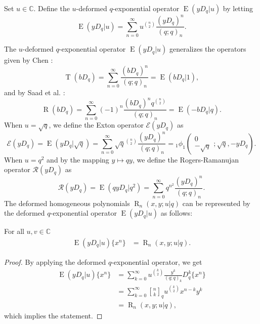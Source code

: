 \documentclass{cimart}
\newcommand{\C}{\mathbb{C}}
\newcommand{\qbinom}{\genfrac{[}{]}{0pt}{}}
\DeclareMathOperator{\opE}{E}
\DeclareMathOperator{\opR}{R}
\DeclareMathOperator{\opT}{T}
\begin{document}
\begin{definition}\label{def_translation}
Set $u\in\C$. Define the $u$-deformed $q$-exponential operator $\opE(yD_{q}|u)$ by letting 
\begin{equation}
    \opE(yD_{q}|u)=\sum_{n=0}^{\infty}u^{\binom{n}{2}}\frac{(yD_{q})^{n}}{(q;q)_{n}}. 
\end{equation}
\end{definition}
The $u$-deformed $q$-exponential operator $\opE(yD_{q}|u)$ generalizes the operators given by Chen \cite{chen2}:
\begin{equation}
    \opT(bD_{q})=\sum_{n=0}^{\infty}\frac{(bD_{q})^n}{(q;q)_{n}}=\opE(bD_{q}|1),
\end{equation}
and by Saad et al. \cite{saad2}:
\begin{equation}
    \opR(bD_{q})=\sum_{n=0}^{\infty}(-1)^{n}\frac{(bD_{q})^nq^{\binom{n}{2}}}{(q;q)_{n}}=\opE(-bD_{q}|q).
\end{equation}
When $u=\sqrt{q}$, we define the Exton operator $\mathcal{E}(yD_{q})$ as
\begin{equation}
    \mathcal{E}(yD_{q})=\opE(yD_{q}|\sqrt{q})=\sum_{n=0}^{\infty}\sqrt{q}^{\binom{n}{2}}\frac{(yD_{q})^n}{(q;q)_{n}}={}_{1}\phi_{1}\left(\begin{array}{c}
         0\\
         -\sqrt{q}
    \end{array};\sqrt{q},-yD_{q}\right).
\end{equation}
When $u=q^2$ and by the mapping $y\mapsto qy$, we define the Rogers-Ramanujan operator $\mathcal{R}(yD_{q})$ as
\begin{equation}
    \mathcal{R}(yD_{q})=\opE(qyD_{q}|q^2)=\sum_{n=0}^{\infty}q^{n^2}\frac{(yD_{q})^n}{(q;q)_{n}}.
\end{equation}
The deformed homogeneous polynomials $\opR_{n}(x,y;u|q)$ can be represented by the deformed $q$-exponential operator $\opE(yD_{q}|u)$ as follows:
\begin{proposition}\label{prop_translation}
For all $u,v\in\C$
    \begin{align}
        \opE(yD_{q}|u)\big\{x^{n}\big\}&=\opR_{n}(x,y;u|q).
    \end{align}
\end{proposition}
\begin{proof}
By applying the deformed $q$-exponential operator, we get
    \begin{align*}
        \opE(yD_{q}|u)\big\{x^{n}\big\}
        &=\sum_{k=0}^{\infty}u^{\binom{k}{2}}\frac{y^{k}}{(q;q)_{k}}D_{q}^{k}\{x^{n}\}\\
        &=\sum_{k=0}^{\infty}\qbinom{n}{k}_{q}u^{\binom{k}{2}}x^{n-k}y^{k}\\
        &=\opR_{n}(x,y;u|q),
    \end{align*}
which implies the statement.
\end{proof}
\end{document}
